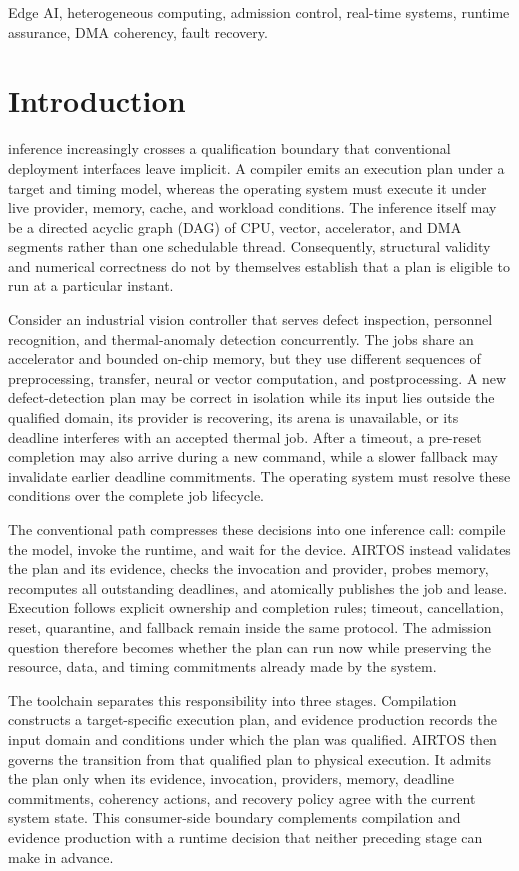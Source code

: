 \documentclass[lettersize,journal]{IEEEtran}
\begin{document}
\begin{IEEEkeywords}
Edge AI, heterogeneous computing, admission control, real-time systems,
runtime assurance, DMA coherency, fault recovery.
\end{IEEEkeywords}

\section{Introduction}
 inference increasingly crosses a qualification boundary
that conventional deployment interfaces leave implicit. A compiler emits an
execution plan under a target and timing model, whereas the operating system
must execute it under live provider, memory, cache, and workload conditions.
The inference itself may be a directed acyclic graph (DAG) of CPU, vector,
accelerator, and DMA segments rather than one schedulable thread. Consequently,
structural validity and numerical correctness do not by themselves establish
that a plan is eligible to run at a particular instant.

Consider an industrial vision controller that serves defect inspection,
personnel recognition, and thermal-anomaly detection concurrently. The jobs
share an accelerator and bounded on-chip memory, but they use different
sequences of preprocessing, transfer, neural or vector computation, and
postprocessing. A new defect-detection plan may be correct in isolation while
its input lies outside the qualified domain, its provider is recovering, its
arena is unavailable, or its deadline interferes with an accepted thermal
job. After a timeout, a pre-reset completion may also arrive during a new
command, while a slower fallback may invalidate earlier deadline commitments.
The operating system must resolve these conditions over the complete job
lifecycle.

The conventional path compresses these decisions into one inference call:
compile the model, invoke the runtime, and wait for the device. AIRTOS instead
validates the plan and its evidence, checks the invocation and provider,
probes memory, recomputes all outstanding deadlines, and atomically publishes
the job and lease. Execution follows explicit ownership and completion rules;
timeout, cancellation, reset, quarantine, and fallback remain inside the same
protocol. The admission question therefore becomes whether the plan can run
now while preserving the resource, data, and timing commitments already made
by the system.

The toolchain separates this responsibility into three stages. Compilation
constructs a target-specific execution plan, and evidence production records
the input domain and conditions under which the plan was qualified. AIRTOS
then governs the transition from that qualified plan to physical execution.
It admits the plan only when its evidence, invocation, providers, memory,
deadline commitments, coherency actions, and recovery policy agree with the
current system state. This consumer-side boundary complements compilation and
evidence production with a runtime decision that neither preceding stage can
make in advance.
\end{document}
